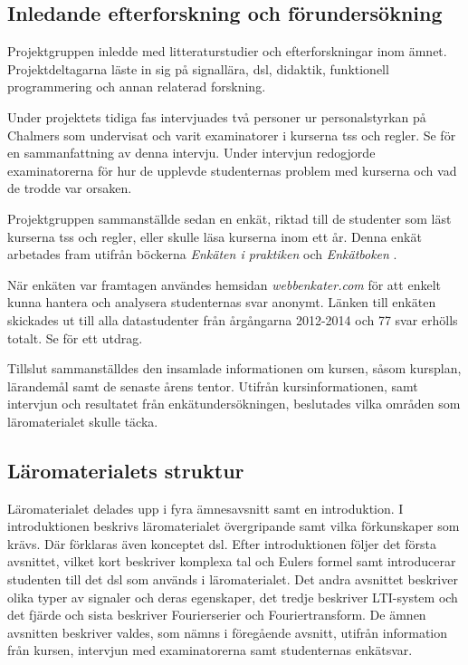 \documentclass[12pt,a4paper,twoside,openright]{article}
\begin{document}
\subsection{Inledande efterforskning och förundersökning}
\label{sec:efterforskning}

Projektgruppen inledde med litteraturstudier och efterforskningar inom
ämnet. Projektdeltagarna läste in sig på signallära, \gls{dsl},
didaktik, funktionell programmering och annan relaterad forskning.

Under projektets tidiga fas intervjuades två personer ur
personalstyrkan på Chalmers som undervisat och varit examinatorer i
kurserna \acrlong{tss} och \gls{regler}. Se
 för en sammanfattning av denna
intervju. Under intervjun redogjorde examinatorerna för hur de
upplevde studenternas problem med kurserna och vad de trodde var
orsaken.

Projektgruppen sammanställde sedan en enkät, riktad till de studenter
som läst kurs\-erna \acrlong{tss} och \gls{regler}, eller skulle läsa
kurserna inom ett år. Denna enkät arbetades fram utifrån böckerna
\textit{Enkäten i praktiken} \cite{enkaten_i_praktiken} och
\textit{Enkätboken} \cite{enkatboken}.

När enkäten var framtagen användes hemsidan \textit{webbenkater.com}
för att enkelt kunna hantera och analysera studenternas svar anonymt.
Länken till enkäten skickades ut till alla datastudenter från
årgångarna 2012-2014 och 77 svar erhölls totalt. Se
 för ett utdrag.

Tillslut sammanställdes den insamlade informationen om
kursen, såsom kursplan, lärandemål samt de senaste årens
tentor. Utifrån kursinformationen, samt intervjun och resultatet från
enkätundersökningen, beslutades vilka områden som läromaterialet
skulle täcka.

\subsection{Läromaterialets struktur}
\label{sec:struktur}
Läromaterialet delades upp i fyra ämnesavsnitt samt en introduktion. I
introduktionen beskrivs läromaterialet övergripande samt vilka
förkunskaper som krävs. Där förklaras även konceptet \gls{dsl}. Efter
introduktionen följer det första avsnittet, vilket kort beskriver
komplexa tal och Eulers formel samt introducerar studenten till det
\gls{dsl} som används i läromaterialet. Det andra avsnittet beskriver
olika typer av signaler och deras egenskaper, det tredje beskriver
LTI-system och det fjärde och sista beskriver Fourierserier och
Fouriertransform. De ämnen avsnitten beskriver valdes, som nämns i
föregående avsnitt, utifrån information från kursen, intervjun med
examinatorerna samt studenternas enkätsvar.
\end{document}
